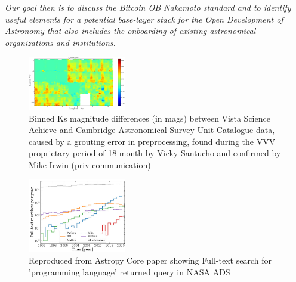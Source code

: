 \documentclass[final,5p,times,twocolumn,authoryear]{elsarticle}
\begin{document}
\emph{Our goal then is to discuss the Bitcoin OB Nakamoto standard and to identify useful elements for a potential base-layer stack for the Open Development of Astronomy that also includes the onboarding of existing astronomical organizations and institutions.}

\begin{figure}
    \centering
    \includegraphics[width=0.38\textwidth]{figs/mapa_dif_Kvsa_Kcasu_grid80_1}
    \vspace*{-0.2cm}
    \caption{Binned Ks magnitude differences (in mags) between Vista Science Achieve and Cambridge Astronomical Survey Unit Catalogue data, caused by a grouting error in preprocessing, found during the VVV proprietary period of 18-month by Vicky Santucho and confirmed by Mike Irwin (priv communication)}
    \label{fig:mapa_dif_Kvsa_Kcasu_grid80_1}
\end{figure}


\begin{figure}
    \centering
    \includegraphics[width=0.38\textwidth]{figs/2206.14220.jpg}
    \vspace*{-0.3cm}
    \caption{Reproduced from Astropy Core paper showing Full-text search for 'programming language' returned query in NASA ADS}
    \label{fig:astropy}
\end{figure}
\end{document}
